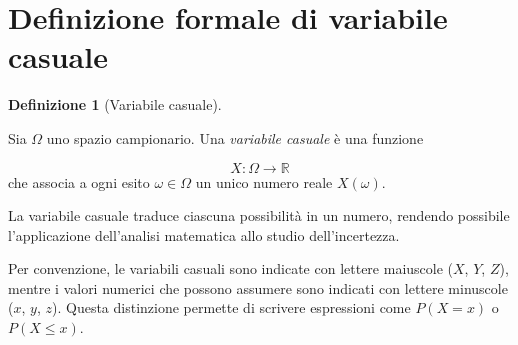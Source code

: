 \documentclass[
  italian,
  letterpaper,
  a4paper,
  11pt,
  open=any]{scrbook}
\theoremstyle{plain}
\theoremstyle{definition}
\theoremstyle{definition}
\newtheorem{definition}{Definizione}[chapter]
\theoremstyle{remark}
\begin{document}
\section{Definizione formale di variabile
casuale}\label{sec-random-variable-definition}

\begin{definition}[Variabile
casuale]\protect\hypertarget{def-random-variable}{}\label{def-random-variable}

Sia \(\Omega\) uno spazio campionario. Una \emph{variabile casuale} è
una funzione

\[
X : \Omega \longrightarrow \mathbb{R}
\] che associa a ogni esito \(\omega \in \Omega\) un unico numero reale
\(X(\omega)\).

\end{definition}

La variabile casuale traduce ciascuna possibilità in un numero, rendendo
possibile l'applicazione dell'analisi matematica allo studio
dell'incertezza.

Per convenzione, le variabili casuali sono indicate con lettere
maiuscole (\(X\), \(Y\), \(Z\)), mentre i valori numerici che possono
assumere sono indicati con lettere minuscole (\(x\), \(y\), \(z\)).
Questa distinzione permette di scrivere espressioni come \(P(X = x)\) o
\(P(X \leq x)\).
\end{document}
